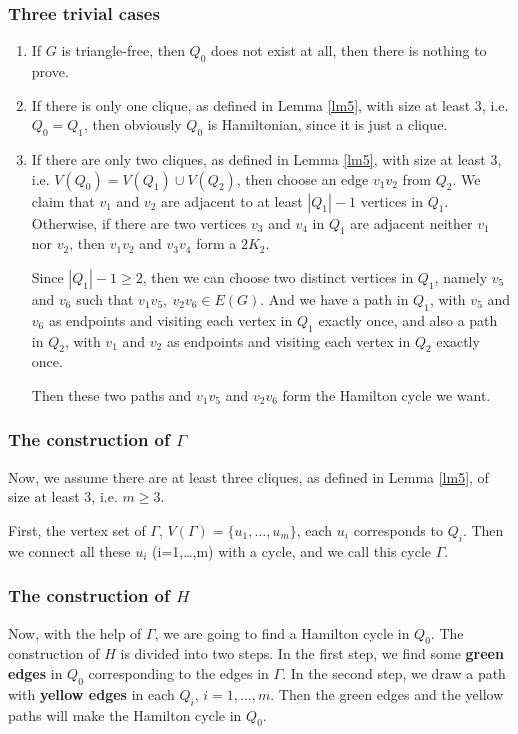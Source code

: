 \documentclass[12pt]{article}
\begin{document}
\subsubsection{Three trivial cases}
\begin{enumerate}
\item If $G$ is triangle-free, then $Q_0$ does not exist at all, then there is nothing to prove.
\item If there is only one clique, as defined in Lemma \ref{lm5}, with size at least 3, i.e. $Q_0=Q_1$, then obviously $Q_0$ is Hamiltonian, since it is just a clique.
\item If there are only two cliques, as defined in Lemma \ref{lm5}, with size at least 3, i.e. $V(Q_0)=V(Q_1)\cup V(Q_2)$, then choose an edge $v_1v_2$ from $Q_2$. We claim that $v_1$ and $v_2$ are adjacent to at least $|Q_1|-1$ vertices in $Q_1$. Otherwise, if there are two vertices $v_3$ and $v_4$ in $Q_1$ are adjacent neither $v_1$ nor $v_2$, then $v_1v_2$ and $v_3v_4$ form a $2K_2$.

Since $|Q_1|-1\ge2$, then we can choose two distinct vertices in $Q_1$, namely $v_5$ and $v_6$ such that $v_1v_5,~v_2v_6\in E(G)$. And we have a path in  $Q_1$, with $v_5$ and $v_6$ as endpoints and visiting each vertex in $Q_1$ exactly once, and also a path in $Q_2$, with $v_1$ and $v_2$ as endpoints and visiting each vertex in $Q_2$ exactly once.

Then these two paths and $v_1v_5$ and $v_2v_6$ form the Hamilton cycle we want.
\end{enumerate}

\subsubsection{The construction of $\Gamma$}

Now, we assume there are at least three cliques, as defined in Lemma \ref{lm5}, of size at least 3, i.e. $m\ge3$.

First, the vertex set of $\Gamma$, $V(\Gamma)=\{u_1,\ldots,u_m\}$, each $u_i$ corresponds to $Q_i$. 
Then we connect all these $u_i$ (i=1,\ldots,m) with a cycle, and we call this cycle $\Gamma$.




\subsubsection{The construction of $H$}
Now, with the help of $\Gamma$, we are going to find a Hamilton cycle in $Q_0$. 
The construction of $H$ is divided into two steps. In the first step, we find some {\bf green edges} in $Q_0$ corresponding to the edges in $\Gamma$. In the second step, we draw a path with {\bf yellow edges} in each $Q_i$, $i=1,\ldots,m$. Then the green edges and the yellow paths will make the Hamilton cycle in $Q_0$.
\end{document}
